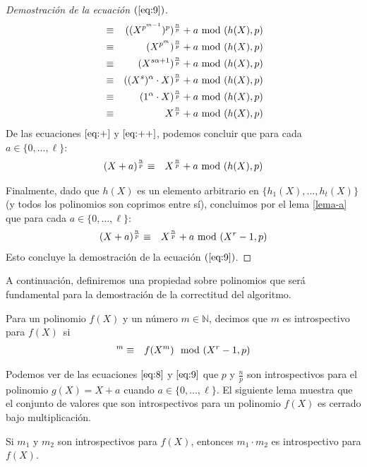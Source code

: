 \begin{proof}[Demostración de la ecuación $(\ref{eq:9})$]
\begin{eqnarray}
		    & \equiv &((X^{p^{m-1}})^p)^{\frac{n}{p}} + a\modulohps\nonumber\\
		    & \equiv &(X^{p^{m}})^{\frac{n}{p}} + a\modulohps\nonumber\\
		    & \equiv &(X^{s\alpha+1})^{\frac{n}{p}} + a\modulohps\nonumber\\
		    & \equiv &((X^{s})^{\alpha}\cdot X)^{\frac{n}{p}} + a\modulohps\nonumber\\
		    & \equiv &(1^{\alpha}\cdot X)^{\frac{n}{p}} + a\modulohps\nonumber\\
		    & \equiv & X^{\frac{n}{p}} + a\modulohps\label{eq:++}
		\end{eqnarray}
		De las ecuaciones $\eqref{eq:+}$ y $\eqref{eq:++}$, podemos concluir que para cada $a \in \{0, \ldots, \ell\}$:
		\begin{eqnarray*}
		    (X+a)^{\frac{n}{p}}&\equiv &X^{\frac{n}{p}} + a\!\!\mod (h(X),p)
		\end{eqnarray*}
		
		Finalmente, dado que $h(X)$ es un elemento arbitrario en $\{h_1(X),...,h_t(X)\}$ (y todos los polinomios son coprimos entre sí), concluimos por el lema \ref{lema-a} que para cada $a \in \{0, \ldots, \ell\}$:
		\begin{eqnarray*}
		    (X+a)^{\frac{n}{p}}&\equiv &X^{\frac{n}{p}} + a\!\!\mod (X^r-1,p)
		\end{eqnarray*}
		Esto concluye la demostración de la ecuación $(\ref{eq:9})$.
	\end{proof}		
	A continuación, definiremos una propiedad sobre polinomios que será fundamental para la demostración de la correctitud del algoritmo.
	\begin{definition}
	Para un polinomio $f(X)$ y un número $m\in \mathbb{N}$, decimos que $m$ es introspectivo para $f(X)$~si
	\begin{eqnarray*}
	[f(X)]^m & \equiv & f(X^m) \modulop
	\end{eqnarray*}
	\end{definition}
Podemos ver de las ecuaciones $\eqref{eq:8}$ y $\eqref{eq:9}$ que $p$
y $\frac{n}{p}$ son introspectivos para el polinomio $g(X) = X+a$
cuando $a \in \{0, \ldots, \ell\}$.  El siguiente lema muestra que el
conjunto de valores que son introspectivos para un polinomio $f(X)$ es
cerrado bajo multiplicación.
	\begin{lemma}\label{lema-4.7}
		Si $m_1$ y $m_2$ son introspectivos para $f(X)$, entonces $m_1\cdot m_2$ es introspectivo para $f(X)$.
	\end{lemma}
